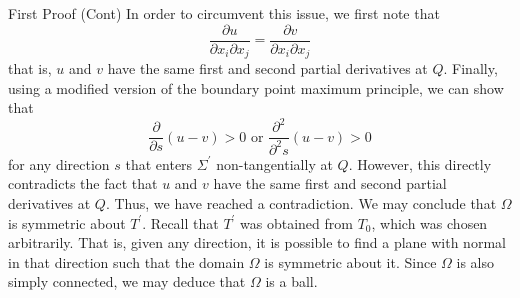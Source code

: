 \documentclass[final]{beamer}
\newlength{\colwidth}
\begin{document}
\begin{frame}[t]
\begin{columns}[t]
\begin{column}{\colwidth}
  \begin{block}{First Proof (Cont)}
	In order to circumvent this issue, we first note that 
	$$
	\frac{\partial{u}}{\partial{x_i}\partial{x_j}} = \frac{\partial{v}}{\partial{x_i}\partial{x_j}}
	$$ that is, $u$ and $v$ have the same first and second partial derivatives at $Q$. Finally, using a modified version of the boundary point maximum principle, we can show that 
	\[
	\frac{\partial}{\partial{s}} (u-v) > 0 \text{ or } \frac{\partial^2}{\partial^2{s}}(u-v) > 0
	\] for any direction $s$ that enters $\Sigma^\prime$ non-tangentially at $Q$. However, this directly contradicts the fact that $u$ and $v$ have the same first and second partial derivatives 	at $Q$. Thus, we have reached a contradiction. We may conclude that $\Omega$ is symmetric about $T^\prime$. Recall that $T^\prime$ was obtained from $T_0$, which was chosen arbitrarily. That is, given any direction, it is possible to find a plane with normal in that direction such that the domain $\Omega$ is symmetric about it. Since $\Omega$ is also simply connected, we may deduce that $\Omega$ is a ball.
	
    \end{block}


\end{column}
\end{columns}
\end{frame}
\end{document}
